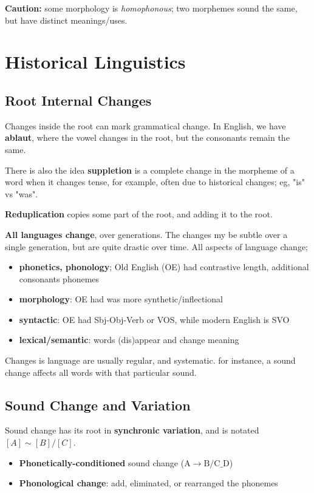 \documentclass[12pt]{article}
\begin{document}
\textbf{Caution:} some morphology is \textit{homophonous}; two morphemes sound the same, but have distinct meanings/uses.

\section{Historical Linguistics}

\subsection{Root Internal Changes}

Changes inside the root can mark grammatical change. In English, we have \textbf{ablaut}, where the vowel changes in the root, but the consonants remain the same.

There is also the idea \textbf{suppletion} is a complete change in the morpheme of a word when it changes tense, for example, often due to historical changes; eg, "is" vs "was". 

\textbf{Reduplication} copies some part of the root, and adding it to the root. 

\textbf{All languages change}, over generations. The changes my be subtle over a single generation, but are quite drastic over time. All aspects of language change; 
\begin{itemize}
  \item \textbf{phonetics, phonology}; Old English (OE) had contrastive length, additional consonants phonemes
  \item \textbf{morphology}: OE had was more synthetic/inflectional
  \item \textbf{syntactic}: OE had Sbj-Obj-Verb or VOS, while modern English is SVO
  \item \textbf{lexical/semantic}: words (dis)appear and change meaning
\end{itemize}

Changes is language are usually regular, and systematic. for instance, a sound change affects all words with that particular sound.

\subsection{Sound Change and Variation}

Sound change has its root in \textbf{synchronic variation}, and is notated $[A] \sim [B]/[C]$.

\begin{itemize}
  \item \textbf{Phonetically-conditioned} sound change ($\text{A} \rightarrow\text{B} / \text{C} \_\text{D}$)
  \item \textbf{Phonological change}: add, eliminated, or rearranged the phonemes
\end{itemize}
\end{document}
